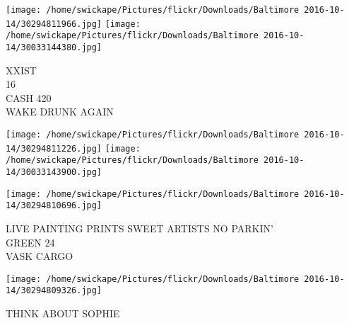 \documentclass[10pt,letterpaper]{article}
\begin{document}
\texttt{[image: /home/swickape/Pictures/flickr/Downloads/Baltimore 2016-10-14/30294811966.jpg]}
\texttt{[image: /home/swickape/Pictures/flickr/Downloads/Baltimore 2016-10-14/30033144380.jpg]}

XXIST\\
16\\
CASH 420\\
WAKE DRUNK AGAIN
\pagebreak

\texttt{[image: /home/swickape/Pictures/flickr/Downloads/Baltimore 2016-10-14/30294811226.jpg]}
\texttt{[image: /home/swickape/Pictures/flickr/Downloads/Baltimore 2016-10-14/30033143900.jpg]}

\vspace{0.25in}
\texttt{[image: /home/swickape/Pictures/flickr/Downloads/Baltimore 2016-10-14/30294810696.jpg]}

LIVE PAINTING PRINTS SWEET ARTISTS NO PARKIN'\\
GREEN 24\\
VASK CARGO
\pagebreak

\texttt{[image: /home/swickape/Pictures/flickr/Downloads/Baltimore 2016-10-14/30294809326.jpg]}

THINK ABOUT SOPHIE
\pagebreak
\end{document}
